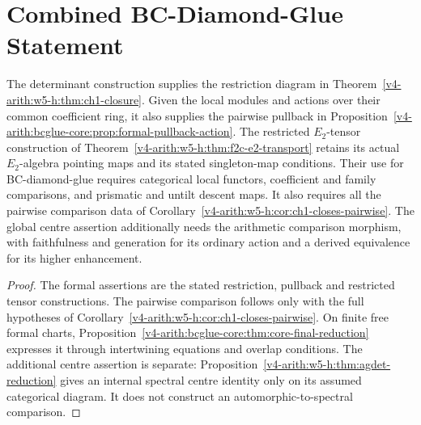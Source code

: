 \section{Combined BC-Diamond-Glue Statement}
\label{v4-arith:w5-h:combined}

\begin{proposition}
\label{v4-arith:w5-h:thm:combined-bcglue}
The determinant construction supplies the restriction diagram in
Theorem~\ref{v4-arith:w5-h:thm:ch1-closure}.
Given the local modules and actions over their common coefficient
ring, it also supplies the pairwise pullback in
Proposition~\ref{v4-arith:bcglue-core:prop:formal-pullback-action}.
The restricted $E_2$-tensor construction of
Theorem~\ref{v4-arith:w5-h:thm:f2c-e2-transport} retains its
actual \(E_2\)-algebra pointing maps and its stated singleton-map
conditions.
Their use for BC-diamond-glue requires categorical local functors,
coefficient and family comparisons, and prismatic and untilt descent maps.
It also requires all the pairwise comparison data of
Corollary~\ref{v4-arith:w5-h:cor:ch1-closes-pairwise}.
The global centre assertion additionally needs the arithmetic
comparison morphism, with faithfulness and generation for its
ordinary action and a derived equivalence for its higher enhancement.
\end{proposition}

\begin{proof}
The formal assertions are the stated restriction, pullback and
restricted tensor constructions. The pairwise comparison follows
only with the full hypotheses of
Corollary~\ref{v4-arith:w5-h:cor:ch1-closes-pairwise}.
On finite free formal charts,
Proposition~\ref{v4-arith:bcglue-core:thm:core-final-reduction}
expresses it through intertwining equations and overlap conditions.
The additional centre assertion is separate:
Proposition~\ref{v4-arith:w5-h:thm:agdet-reduction} gives an internal
spectral centre identity only on its assumed categorical diagram.
It does not construct an automorphic-to-spectral comparison.
\end{proof}

